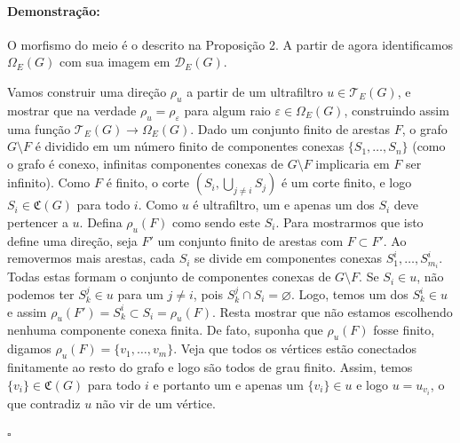 \documentclass[11pt]{article}
\newcommand{\pulinho}{\vspace{.5cm}}
\theoremstyle{definition}
\theoremstyle{definition}
\theoremstyle{definition}
\theoremstyle{definition}
\theoremstyle{definition}
\theoremstyle{definition}
\theoremstyle{definition}
\theoremstyle{definition}
\theoremstyle{definition}
\theoremstyle{definition}
\theoremstyle{definition}
\theoremstyle{definition}
\newenvironment{prova}{\paragraph{Demonstração:}}{\hfill$\square$ 
\pulinho
}
\begin{document}
\begin{prova}
    O morfismo do meio é o descrito na Proposição 2. A partir de agora identificamos $\Omega_E(G)$ com sua imagem em $\mathcal{D}_E(G).$

    Vamos construir uma direção $\rho_u$ a partir de um ultrafiltro $u \in \mathcal{T}_E(G)$, e mostrar que na verdade $\rho_u = \rho_\varepsilon$ para algum raio $\varepsilon \in \Omega_E(G)$, construindo assim uma função $\mathcal{T}_E(G) \rightarrow{} \Omega_E(G)$. Dado um conjunto finito de arestas $F$, o grafo $G \setminus F$ é dividido em um número finito de componentes conexas $\{S_1, \dots, S_n\}$ (como o grafo é conexo, infinitas componentes conexas de $G \setminus F$ implicaria em $F$ ser infinito). Como $F$ é finito, o corte $(S_i, \underset{j \ne i}{\bigcup} S_j)$ é um corte finito, e logo $S_i \in \mathfrak{C}(G)$ para todo $i$. Como $u$ é ultrafiltro, um e apenas um dos $S_i$ deve pertencer a $u$. Defina $\rho_u(F)$ como sendo este $S_i$. Para mostrarmos que isto define uma direção, seja $F'$ um conjunto finito de arestas com $F \subset F'$. Ao removermos mais arestas, cada $S_i$ se divide em componentes conexas $S_{1}^{i},\dots, S_{m_i}^{i}$. Todas estas formam o conjunto de componentes conexas de $G \setminus F$. Se $S_i \in u$, não podemos ter $S_k^{j} \in u$ para um $j \neq i$, pois $S_k^{j} \cap S_i = \varnothing$. Logo, temos um dos $S_k^{i} \in u$ e assim $\rho_u(F') = S_k^{i} \subset S_i = \rho_u(F)$. Resta mostrar que não estamos escolhendo nenhuma componente conexa finita. De fato, suponha que $\rho_u(F)$ fosse finito, digamos $\rho_u(F) = \{v_1, \dots, v_m\}$. Veja que todos os vértices estão conectados finitamente ao resto do grafo e logo são todos de grau finito. Assim, temos $\{v_i\} \in \mathfrak{C}(G)$ para todo $i$ e portanto um e apenas um $\{v_i\} \in u$ e logo $u = u_{v_i}$, o que contradiz $u$ não vir de um vértice.


\end{prova}
\end{document}
